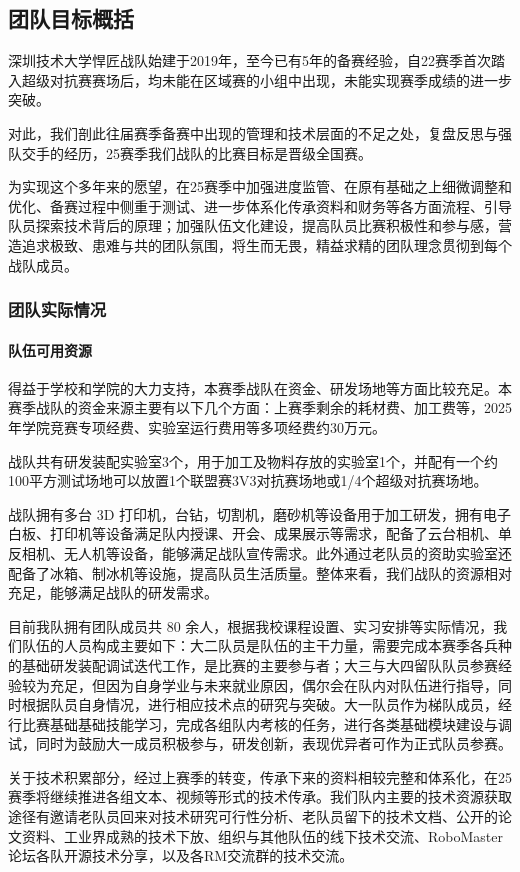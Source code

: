 \subsection{团队目标概括}

        深圳技术大学悍匠战队始建于2019年，至今已有5年的备赛经验，自22赛季首次踏入超级对抗赛赛场后，均未能在区域赛的小组中出现，未能实现赛季成绩的进一步突破。\par
        对此，我们剖此往届赛季备赛中出现的管理和技术层面的不足之处，复盘反思与强队交手的经历，25赛季我们战队的比赛目标是晋级全国赛。\par
        为实现这个多年来的愿望，在25赛季中加强进度监管、在原有基础之上细微调整和优化、备赛过程中侧重于测试、进一步体系化传承资料和财务等各方面流程、引导队员探索技术背后的原理；加强队伍文化建设，提高队员比赛积极性和参与感，营造追求极致、患难与共的团队氛围，将生而无畏，精益求精的团队理念贯彻到每个战队成员。\par

        \subsubsection{团队实际情况}

            \paragraph{队伍可用资源}

                得益于学校和学院的大力支持，本赛季战队在资金、研发场地等方面比较充足。本赛季战队的资金来源主要有以下几个方面：上赛季剩余的耗材费、加工费等，2025年学院竞赛专项经费、实验室运行费用等多项经费约30万元。\par
                战队共有研发装配实验室3个，用于加工及物料存放的实验室1个，并配有一个约100平方测试场地可以放置1个联盟赛3V3对抗赛场地或1/4个超级对抗赛场地。\par
                战队拥有多台 3D 打印机，台钻，切割机，磨砂机等设备用于加工研发，拥有电子白板、打印机等设备满足队内授课、开会、成果展示等需求，配备了云台相机、单反相机、无人机等设备，能够满足战队宣传需求。此外通过老队员的资助实验室还配备了冰箱、制冰机等设施，提高队员生活质量。整体来看，我们战队的资源相对充足，能够满足战队的研发需求。\par
                目前我队拥有团队成员共 80 余人，根据我校课程设置、实习安排等实际情况，我们队伍的人员构成主要如下：大二队员是队伍的主干力量，需要完成本赛季各兵种的基础研发装配调试迭代工作，是比赛的主要参与者；大三与大四留队队员参赛经验较为充足，但因为自身学业与未来就业原因，偶尔会在队内对队伍进行指导，同时根据队员自身情况，进行相应技术点的研究与突破。大一队员作为梯队成员，经行比赛基础基础技能学习，完成各组队内考核的任务，进行各类基础模块建设与调试，同时为鼓励大一成员积极参与，研发创新，表现优异者可作为正式队员参赛。\par
                关于技术积累部分，经过上赛季的转变，传承下来的资料相较完整和体系化，在25赛季将继续推进各组文本、视频等形式的技术传承。我们队内主要的技术资源获取途径有邀请老队员回来对技术研究可行性分析、老队员留下的技术文档、公开的论文资料、工业界成熟的技术下放、组织与其他队伍的线下技术交流、RoboMaster论坛各队开源技术分享，以及各RM交流群的技术交流。\par


